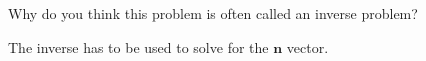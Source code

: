 Why do you think this problem is often called an inverse problem?

\begin{solution}
The inverse has to be used to solve for the $\boldsymbol{n}$ vector.
\end{solution}